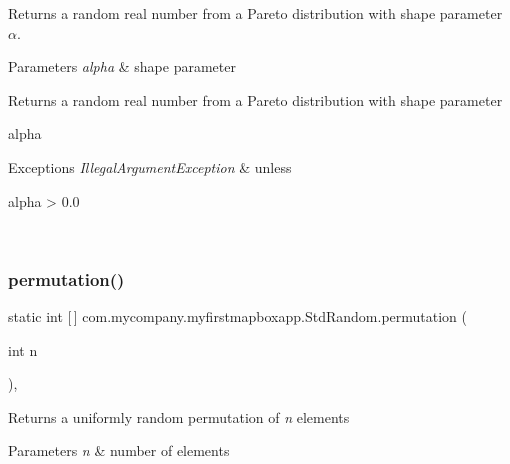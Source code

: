 Returns a random real number from a Pareto distribution with shape parameter {$\alpha$}.


\begin{DoxyParams}{Parameters}
{\em alpha} & shape parameter \\
\hline
\end{DoxyParams}
\begin{DoxyReturn}{Returns}
a random real number from a Pareto distribution with shape parameter
\begin{DoxyCode}
alpha 
\end{DoxyCode}
 
\end{DoxyReturn}

\begin{DoxyExceptions}{Exceptions}
{\em Illegal\+Argument\+Exception} & unless
\begin{DoxyCode}
alpha > 0.0 
\end{DoxyCode}
 \\
\hline
\end{DoxyExceptions}
\mbox{\label{classcom_1_1mycompany_1_1myfirstmapboxapp_1_1_std_random_af712bf6c6b5da54e928785ba3a4ccf91}} 
\subsubsection{\texorpdfstring{permutation()}{permutation()}\hspace{0.1cm}{\footnotesize\ttfamily [1/2]}}
{\footnotesize\ttfamily static int \mbox{[}$\,$\mbox{]} com.\+mycompany.\+myfirstmapboxapp.\+Std\+Random.\+permutation (\begin{DoxyParamCaption}\item[{int}]{n }\end{DoxyParamCaption})\hspace{0.3cm}{\ttfamily [inline]}, {\ttfamily [static]}}

Returns a uniformly random permutation of {\itshape n} elements


\begin{DoxyParams}{Parameters}
{\em n} & number of elements \\
\hline
\end{DoxyParams}

